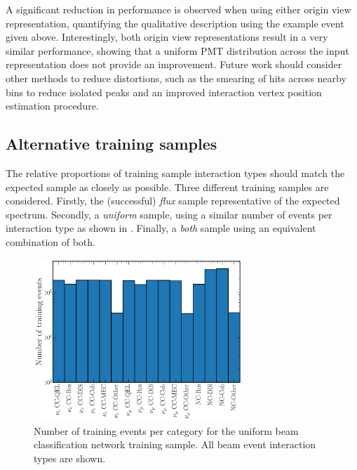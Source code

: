 A significant reduction in performance is observed when using either origin view representation,
quantifying the qualitative description using the example event given above. Interestingly, both
origin view representations result in a very similar performance, showing that a uniform PMT
distribution across the input representation does not provide an improvement. Future work should
consider other methods to reduce distortions, such as the smearing of hits across nearby bins to
reduce isolated peaks and an improved interaction vertex position estimation procedure.

\subsection{Alternative training samples} %
\label{sec:results_samples} %

The relative proportions of training sample interaction types should match the expected sample as
closely as possible. Three different training samples are considered. Firstly, the (successful)
\emph{flux} sample representative of the expected spectrum. Secondly, a \emph{uniform} sample,
using a similar number of events per interaction type as shown in
. Finally, a \emph{both} sample using an equivalent
combination of both.

\begin{figure} %
    \includegraphics[width=0.7\textwidth]{diagrams/7-results/explore_uniform_training_sample.pdf}
    \caption[Number of training events per category for the uniform beam classification network
        training sample] {Number of training events per category for the uniform beam
        classification network training sample. All beam event interaction types are shown.}
    \label{fig:explore_uniform_training_sample}
\end{figure}


